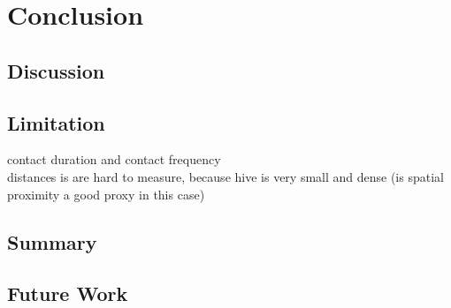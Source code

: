 \chapter{Conclusion}

\section{Discussion}

\section{Limitation}
contact duration and contact frequency\\
distances is are hard to measure, because hive is very small and dense (is spatial proximity a good proxy in this case)\\

\section{Summary}

\section{Future Work}
